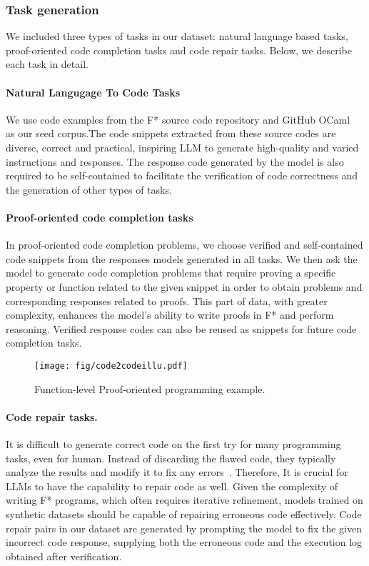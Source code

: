 \subsubsection{Task generation}
We included three types of tasks in our dataset: natural language based tasks, proof-oriented code completion tasks and code repair tasks. Below, we describe each task in detail.

\paragraph{Natural Langugage To Code Tasks}

We use code examples from the F* source code repository and GitHub OCaml ~\cite{ocamlgithub} as our seed corpus.The code snippets extracted from these source codes are diverse, correct and practical, inspiring LLM to generate high-quality and varied instructions and responses. The response code generated by the model is also required to be self-contained to facilitate the verification of code correctness and the generation of other types of tasks. 

\paragraph{Proof-oriented code completion tasks}
In proof-oriented code completion problems, we choose verified and self-contained code snippets from the responses models generated in all tasks. We then ask the model to generate code completion problems that require proving a specific property or function related to the given snippet in order to obtain problems and corresponding responses related to proofs. This part of data, with greater complexity, enhances the model’s ability to write proofs in F* and perform reasoning. Verified response codes can also be reused as snippets for future code completion tasks.
\begin{figure}[htbp]
    \centering
    \texttt{[image: fig/code2codeillu.pdf]}
    \caption{Function-level Proof-oriented programming example.}
    \label{fig:code2codeillu}
\end{figure}
\paragraph{Code repair tasks.}
It is difficult to generate correct code on the first try for many programming tasks, even for human. Instead of discarding the flawed code, they typically analyze the results and modify it to fix any errors~\cite{chen2023teaching}. Therefore, It is crucial for LLMs to have the capability to repair code as well.  Given the complexity of writing F* programs, which often requires iterative refinement, models trained on synthetic datasets should be capable of repairing erroneous code effectively. Code repair pairs in our dataset are generated by prompting the model to fix the given incorrect code response, supplying both the erroneous code and the execution log obtained after verification. 


